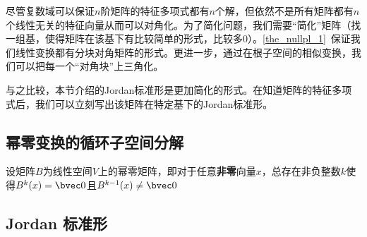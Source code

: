 

\begin{issues}
\issueDraft
\end{issues}
尽管复数域可以保证$n$阶矩阵的特征多项式都有$n$个解，但依然不是所有矩阵都有$n$个线性无关的特征向量从而可以对角化。为了简化问题，我们需要“简化”矩阵（找一组基，使得矩阵在该基下有比较简单的形式，比较多$0$）。\autoref{the_nullpl_1}~保证我们线性变换都有分块对角矩阵的形式。更进一步，通过在根子空间的相似变换，我们可以把每一个“对角块”上三角化。

与之比较，本节介绍的Jordan标准形是更加简化的形式。在知道矩阵的特征多项式后，我们可以立刻写出该矩阵在特定基下的Jordan标准形。
\subsection{幂零变换的循环子空间分解}
设矩阵$B$为线性空间$V$上的幂零矩阵，即对于任意\textbf{非零}向量$x$，总存在非负整数$k$使得$B^{k}(x)=\bvec 0$且$B^{k-1}(x)\neq \bvec 0$
\subsection{Jordan 标准形}